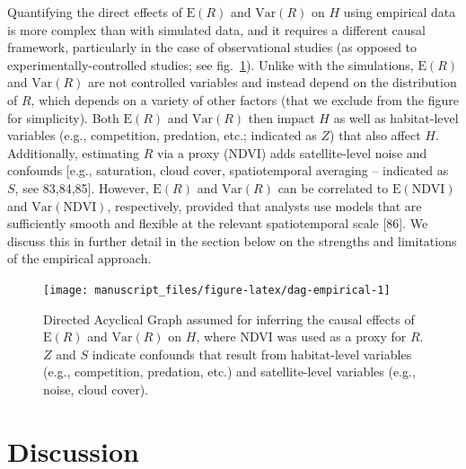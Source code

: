 \documentclass[
  12pt,
]{article}
\begin{document}
Quantifying the direct effects of \(\text{E}(R)\) and \(\text{Var}(R)\) on \(H\) using empirical data is more complex than with simulated data, and it requires a different causal framework, particularly in the case of observational studies (as opposed to experimentally-controlled studies; see fig.~\ref{fig:dag-empirical}). Unlike with the simulations, \(\text{E}(R)\) and \(\text{Var}(R)\) are not controlled variables and instead depend on the distribution of \(R\), which depends on a variety of other factors (that we exclude from the figure for simplicity). Both \(\text{E}(R)\) and \(\text{Var}(R)\) then impact \(H\) as well as habitat-level variables (e.g., competition, predation, etc.; indicated as \(Z\)) that also affect \(H\). Additionally, estimating \(R\) via a proxy (NDVI) adds satellite-level noise and confounds {[}e.g., saturation, cloud cover, spatiotemporal averaging -- indicated as \(S\), see 83,84,85{]}. However, \(\text{E}(R)\) and \(\text{Var}(R)\) can be correlated to \(\text{E}(\text{NDVI})\) and \(\text{Var}(\text{NDVI})\), respectively, provided that analysts use models that are sufficiently smooth and flexible at the relevant spatiotemporal scale {[}86{]}. We discuss this in further detail in the section below on the strengths and limitations of the empirical approach.

\begin{figure}

{\centering \texttt{[image: manuscript\_files/figure-latex/dag-empirical-1]} 

}

\caption{Directed Acyclical Graph assumed for inferring the causal effects of $\text{E}(R)$ and $\text{Var}(R)$ on $H$, where NDVI was used as a proxy for $R$. $Z$ and $S$ indicate confounds that result from habitat-level variables (e.g., competition, predation, etc.) and satellite-level variables (e.g., noise, cloud cover).}\label{fig:dag-empirical}
\end{figure}

\section{Discussion}\label{discussion}
\end{document}
